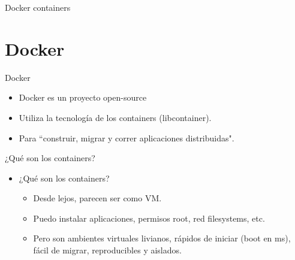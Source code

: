 \documentclass[compress]{beamer}
\begin{document}
\begin{frame}{Docker containers}
	\begin{figure}
		\centering
{}
	\end{figure}
\end{frame}


%
%
\section{Docker}

\begin{frame}{Docker}
	\begin{itemize}
		\item Docker es un proyecto open-source
		\item Utiliza la tecnología de los containers (libcontainer).
		\item Para ``construir, migrar y correr aplicaciones distribuidas".
	\end{itemize}

\end{frame}

\begin{frame}{¿Qué son los containers?}
	\begin{itemize}
		\item ¿Qué son los containers?
			\begin{itemize}
				\item Desde lejos, parecen ser como VM.
				\item Puedo instalar aplicaciones, permisos root, red filesystems, etc.
				\item Pero son ambientes virtuales livianos, rápidos de iniciar (boot en ms), fácil de migrar, reproducibles y aislados.
			\end{itemize}
	\end{itemize}
\end{frame}


\begin{frame}{}
	\begin{figure}
		\centering
	\end{figure}
\end{frame}
\end{document}
